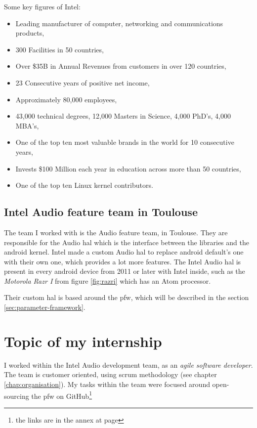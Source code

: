 Some key figures of Intel:
\begin{itemize}
\item Leading manufacturer of computer, networking and communications
  products,
  \item 300 Facilities in 50 countries,
  \item Over \$35B in Annual Revenues from customers in over 120
    countries,
\item 23 Consecutive years of positive net income,
\item Approximately 80,000 employees,
\item 43,000 technical degrees, 12,000 Masters in Science, 4,000
  PhD’s, 4,000 MBA’s,
  \item One of the top ten most valuable brands in the world for 10
    consecutive years,
\item Invests \$100 Million each year in education across more than 50
  countries,
\item One of the top ten Linux \gls{kernel} contributors.
\end{itemize}

\subsection{Intel Audio feature team in Toulouse}
The team I worked with is the Audio feature team, in Toulouse.
They are responsible for the Audio \gls{hal} which is the interface between the
libraries and the \gls{android} \gls{kernel}. Intel made a custom Audio \gls{hal} to
replace \gls{android} default's one with their own one, which provides a lot more features.
The Intel Audio \gls{hal} is present in every \gls{android} device from 2011 or later with Intel inside, such
as the \emph{Motorola Razr I} from figure \ref{fig:razri} which has an Atom processor.

Their custom \gls{hal} is based around the \gls{pfw}, which will be described in the section \ref{sec:parameter-framework}.


\section{Topic of my internship}
I worked within the Intel Audio development team, as an \emph{agile
software developer}. The team is customer oriented, using \gls{scrum}
methodology (see chapter \ref{chap:organisation}). My tasks
within the team were focused around open-sourcing the \gls{pfw} on
\gls{GitHub}\footnote{the links are in the annex at page \pageref{chap:annex}}


